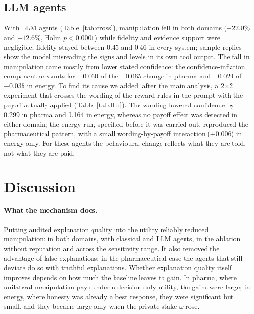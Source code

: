 \documentclass[pdflatex,sn-basic]{sn-jnl}
\begin{document}
\subsection{LLM agents}\label{sec:llmresults}



With LLM agents (Table~\ref{tab:cross}), manipulation fell in both domains ($-22.0\%$ and
$-12.6\%$, Holm $p<0.0001$) while fidelity and evidence support were negligible; fidelity
stayed between 0.45 and 0.46 in every system; sample replies show the model misreading the
signs and levels in its own tool output. The fall in manipulation came mostly from lower
stated confidence: the confidence-inflation component accounts for $-0.060$ of the $-0.065$
change in pharma and $-0.029$ of $-0.035$ in energy. To find its
cause we added, after the main analysis, a 2$\times$2 experiment that crosses the wording of
the reward rules in the prompt with the payoff actually applied (Table~\ref{tab:llm}). The
wording lowered confidence by 0.299 in pharma and 0.164 in energy, whereas no payoff effect was
detected in either domain; the energy run, specified before it was carried out, reproduced the
pharmaceutical pattern, with a small wording-by-payoff interaction ($+0.006$) in energy only.
For these agents the behavioural change reflects what they are told, not what they are paid.

\section{Discussion}\label{sec:discussion}

\paragraph{What the mechanism does.} Putting audited explanation quality into the utility
reliably reduced manipulation: in both domains, with classical and LLM agents, in the ablation
without reputation and across the sensitivity range. It also removed the advantage of false
explanations: in the pharmaceutical case the agents that still deviate do so with truthful
explanations. Whether explanation quality itself improves depends on how much the baseline
leaves to gain. In pharma, where unilateral manipulation pays under a decision-only utility,
the gains were large; in energy, where honesty was already a best response, they were
significant but small, and they became large only when the private stake $\omega$ rose.
\end{document}
